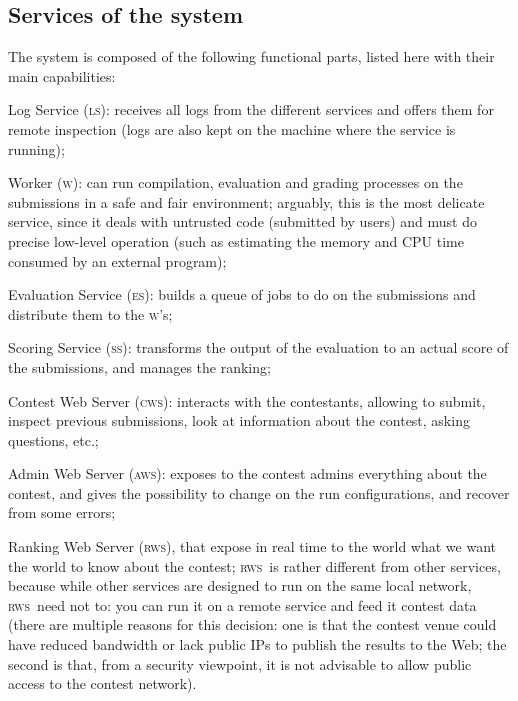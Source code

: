\documentclass[a4paper,8pt]{amsart}
\newcommand{\LS}{\textsc{ls}}
\newcommand{\ES}{\textsc{es}}
\newcommand{\WS}{\textsc{w}}
\renewcommand{\SS}{\textsc{ss}}
\newcommand{\CWS}{\textsc{cws}}
\newcommand{\AWS}{\textsc{aws}}
\newcommand{\RWS}{\textsc{rws}}
\newenvironment{squishlist}{%
  \begin{list}{\textbullet}%
    { \setlength{\itemsep}{0pt}%
      \setlength{\parsep}{3pt}%
      \setlength{\topsep}{3pt}%
      \setlength{\partopsep}{0pt}%
      \setlength{\leftmargin}{1.5em}%
      \setlength{\labelwidth}{1em}%
      \setlength{\labelsep}{0.5em} }%
}{\end{list}}
\begin{document}
\begin{multicols}{2}
  \subsection{Services of the system}

  The system is composed of the following functional parts, listed
  here with their main capabilities:
  \begin{squishlist}
  \item Log Service (\LS{}): receives all logs from the different
    services and offers them for remote inspection (logs are also kept
    on the machine where the service is running);
  \item Worker (\WS{}): can run compilation, evaluation and grading
    processes on the submissions in a safe and fair environment;
    arguably, this is the most delicate service, since it deals with
    untrusted code (submitted by users) and must do precise low-level
    operation (such as estimating the memory and CPU time consumed by
    an external program);
  \item Evaluation Service (\ES{}): builds a queue of jobs to do on the
    submissions and distribute them to the \WS{}'s;
  \item Scoring Service (\SS{}): transforms the output of the
    evaluation to an actual score of the submissions, and manages the
    ranking;
  \item Contest Web Server (\CWS{}): interacts with the contestants,
    allowing to submit, inspect previous submissions, look at
    information about the contest, asking questions, etc.;
  \item Admin Web Server (\AWS{}): exposes to the contest admins
    everything about the contest, and gives the possibility to change
    on the run configurations, and recover from some errors;
  \item Ranking Web Server (\RWS{}), that expose in real time to the
    world what we want the world to know about the contest; \RWS\ is
    rather different from other services, because while other services
    are designed to run on the same local network, \RWS\ need not to:
    you can run it on a remote service and feed it contest data (there
    are multiple reasons for this decision: one is that the contest
    venue could have reduced bandwidth or lack public IPs to publish
    the results to the Web; the second is that, from a security
    viewpoint, it is not advisable to allow public access to the
    contest network).
  \end{squishlist}


\end{multicols}
\end{document}
